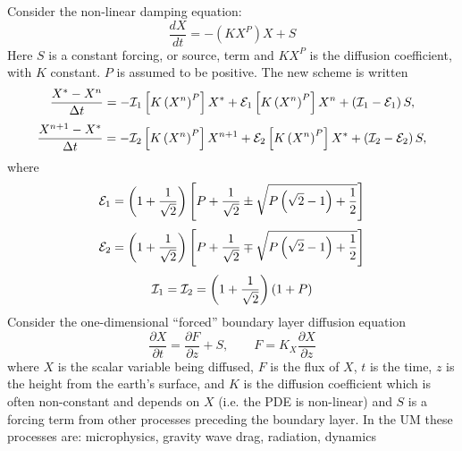 \documentclass{UMDP_article}
\begin{document}
Consider the non-linear damping equation:
\begin{equation}
  \frac{dX}{dt}=-\left(KX^{P}\right)X+S
  \label{eq:damp1}
\end{equation}
Here $S$ is a constant forcing, or source, term and $KX^{P}$ is the
diffusion coefficient, with $K$ constant. $P$ is assumed to be
positive. The new scheme is written
\begin{equation}
  \frac{X^{*}-X^{n}}{\Delta t}=-{\cal I}_{1}\left[K\left(X^{n}\right)^{P}\right]
  X^{*}+{\cal E}_{1}\left[K\left(X^{n}\right)^{P}\right]
  X^{n}+\left({\cal I}_{1}-{\cal E}_{1}\right)S,\label{eq:sppf1}
\end{equation}
\begin{equation}
  \frac{X^{n+1}-X^{*}}{\Delta
    t}=-{\cal I}_{2}\left[K\left(X^{n}\right)^{P}\right]X^{n+1} + 
        {\cal E}_{2}\left[K\left(X^{n}\right)^{P}\right]X^{*} + 
  \left({\cal I}_{2}-{\cal E}_{2}\right)S,\label{eq:sppf2}
\end{equation}
where
\begin{equation}
  {\cal E}_{1}=\left(1+\frac{1}{\sqrt{2}}\right)
  \left[P+\frac{1}{\sqrt{2}}\pm\sqrt{P
      \left(\sqrt{2}-1\right)+\frac{1}{2}}\right]
  \label{eq:E1coeff}
\end{equation}
\begin{equation}
  {\cal E}_{2}=\left(1+\frac{1}{\sqrt{2}}\right)
  \left[P+\frac{1}{\sqrt{2}}\mp\sqrt{P\left(\sqrt{2}-1\right)+\frac{1}{2}}\right]
  \label{eq:E2coeff}
\end{equation}
\begin{equation}
  {\cal I}_{1}={\cal I}_{2}=\left(1+\frac{1}{\sqrt{2}}\right)\left(1+P\right)
  \label{eq:Icoeff}
\end{equation}
Consider the one-dimensional ``forced'' boundary layer diffusion
equation
\begin{equation}
  \frac{\partial X}{\partial t}=\frac{\partial F}{\partial z}+S,
  \qquad F=K_{X}\frac{\partial X}{\partial z}
  \label{eq:vdiff1}
\end{equation}
where $X$ is the scalar variable being diffused, $F$ is the flux of
$X$, $t$ is the time, $z$ is the height from the earth's surface, and
$K$ is the diffusion coefficient which is often non-constant and
depends on $X$ (i.e. the PDE is non-linear) and $S$ is a forcing term
from other processes preceding the boundary layer. In the UM these
processes are: microphysics, gravity wave drag, radiation, dynamics
\end{document}
